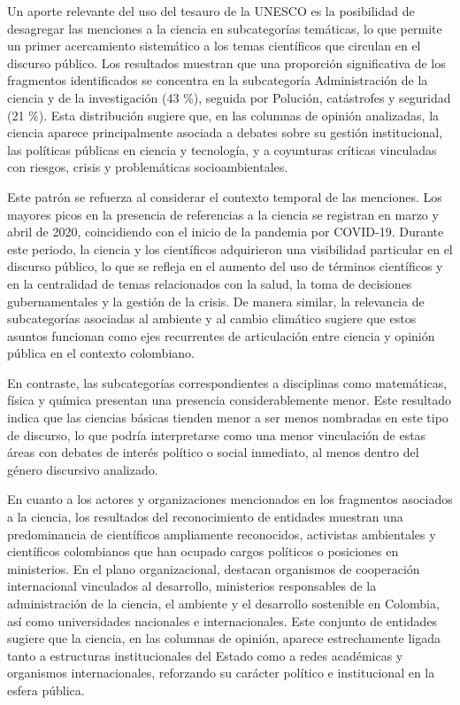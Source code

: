 \documentclass[11pt,a4paper]{article}
\begin{document}
Un aporte relevante del uso del tesauro de la UNESCO es la posibilidad de desagregar las menciones a la ciencia en subcategorías temáticas, lo que permite un primer acercamiento sistemático a los temas científicos que circulan en el discurso público. Los resultados muestran que una proporción significativa de los fragmentos identificados se concentra en la subcategoría Administración de la ciencia y de la investigación (43 \%), seguida por Polución, catástrofes y seguridad (21 \%). Esta distribución sugiere que, en las columnas de opinión analizadas, la ciencia aparece principalmente asociada a debates sobre su gestión institucional, las políticas públicas en ciencia y tecnología, y a coyunturas críticas vinculadas con riesgos, crisis y problemáticas socioambientales.

Este patrón se refuerza al considerar el contexto temporal de las menciones. Los mayores picos en la presencia de referencias a la ciencia se registran en marzo y abril de 2020, coincidiendo con el inicio de la pandemia por COVID-19. Durante este periodo, la ciencia y los científicos adquirieron una visibilidad particular en el discurso público, lo que se refleja en el aumento del uso de términos científicos y en la centralidad de temas relacionados con la salud, la toma de decisiones gubernamentales y la gestión de la crisis. De manera similar, la relevancia de subcategorías asociadas al ambiente y al cambio climático sugiere que estos asuntos funcionan como ejes recurrentes de articulación entre ciencia y opinión pública en el contexto colombiano.

En contraste, las subcategorías correspondientes a disciplinas como matemáticas, física y química presentan una presencia considerablemente menor. Este resultado indica que las ciencias básicas tienden menor a ser menos nombradas en este tipo de discurso, lo que podría interpretarse como una menor vinculación de estas áreas con debates de interés político o social inmediato, al menos dentro del género discursivo analizado.

En cuanto a los actores y organizaciones mencionados en los fragmentos asociados a la ciencia, los resultados del reconocimiento de entidades muestran una predominancia de científicos ampliamente reconocidos, activistas ambientales y científicos colombianos que han ocupado cargos políticos o posiciones en ministerios. En el plano organizacional, destacan organismos de cooperación internacional vinculados al desarrollo, ministerios responsables de la administración de la ciencia, el ambiente y el desarrollo sostenible en Colombia, así como universidades nacionales e internacionales. Este conjunto de entidades sugiere que la ciencia, en las columnas de opinión, aparece estrechamente ligada tanto a estructuras institucionales del Estado como a redes académicas y organismos internacionales, reforzando su carácter político e institucional en la esfera pública.
\end{document}
